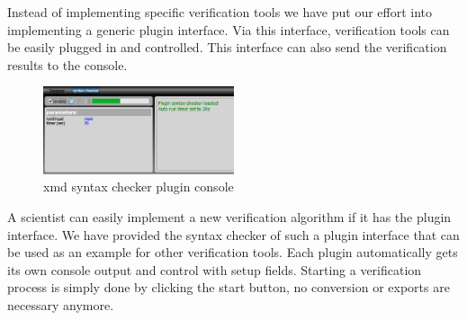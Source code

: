 Instead of implementing specific verification tools we have put our effort into
implementing a generic plugin interface. Via this interface, verification tools
can be easily plugged in and controlled. This interface can also send the
verification results to the console.
\begin{figure}
  \vspace{-20pt}
  \begin{center}
    \includegraphics[width=0.50\textwidth]{console}
  \end{center}
  \vspace{-20pt}
  \caption{xmd syntax checker plugin console}
  \label{fig:console}
  \vspace{-10pt}
\end{figure}
A scientist can easily implement a new verification algorithm if it has the
plugin interface. We have provided the syntax checker of such a plugin interface
that can be used as an example for other verification tools. Each plugin
automatically gets its own console output and control with setup fields.
Starting a verification process is simply done by clicking the start button, no
conversion or exports are necessary anymore.


